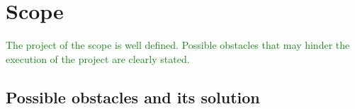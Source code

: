 
\chapter{Scope} %

\label{Chapter2} %

\textcolor{green}{The project of the scope is well defined. Possible obstacles that may hinder the execution of the project are clearly stated.}

\section{Possible obstacles and its solution}